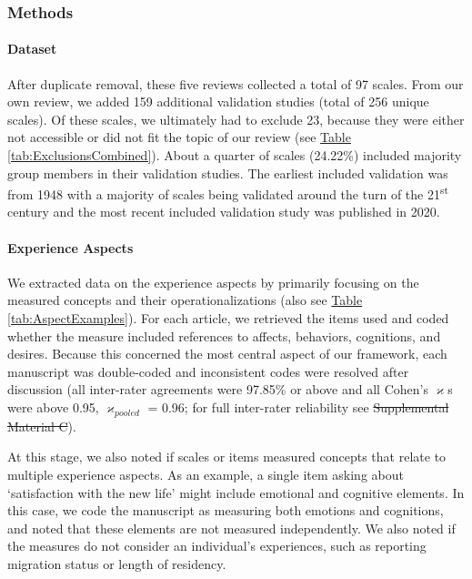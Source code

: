 \documentclass[man, 12pt, a4paper, mask]{apa7}
\newcommand{\tblref}[2][]{\hyperref[#2]{Table \ref*{#2}#1}}
\newcommand{\siannotatedanalyses}{Supplemental Material B} %
\providecommand{\DIFaddtex}[1]{{\protect\color{blue}\uwave{#1}}} %
\providecommand{\DIFdeltex}[1]{{\protect\color{red}\sout{#1}}}                      %
\providecommand{\DIFaddbegin}{} %
\providecommand{\DIFaddend}{} %
\providecommand{\DIFdelbegin}{} %
\providecommand{\DIFdelend}{} %
\providecommand{\DIFadd}[1]{\texorpdfstring{\DIFaddtex{#1}}{#1}} %
\providecommand{\DIFdel}[1]{\texorpdfstring{\DIFdeltex{#1}}{}} %
\newcommand{\DIFscaledelfig}{0.5}
\newlength{\DIFdelgraphicswidth} %
\newlength{\DIFdelgraphicsheight} %
\newcommand{\DIFaddincludegraphics}[2][]{{\color{blue}\fbox{\DIFOincludegraphics[#1]{#2}}}} %
\newcommand{\DIFdelincludegraphics}[2][]{%
\sbox{\DIFdelgraphicsbox}{\DIFOincludegraphics[#1]{#2}}%
\settoboxwidth{\DIFdelgraphicswidth}{\DIFdelgraphicsbox} %
\settoboxtotalheight{\DIFdelgraphicsheight}{\DIFdelgraphicsbox} %
\scalebox{\DIFscaledelfig}{%
\parbox[b]{\DIFdelgraphicswidth}{\usebox{\DIFdelgraphicsbox}\\[-\baselineskip] \rule{\DIFdelgraphicswidth}{0em}}\llap{\resizebox{\DIFdelgraphicswidth}{\DIFdelgraphicsheight}{%
\setlength{\unitlength}{\DIFdelgraphicswidth}%
\begin{picture}(1,1)%
\thicklines\linethickness{2pt} %
{\color[rgb]{1,0,0}\put(0,0){\framebox(1,1){}}}%
{\color[rgb]{1,0,0}\put(0,0){\line( 1,1){1}}}%
{\color[rgb]{1,0,0}\put(0,1){\line(1,-1){1}}}%
\end{picture}%
}\hspace*{3pt}}} %
} %
\DeclareRobustCommand{\DIFaddbegin}{\DIFOaddbegin \let\includegraphics\DIFaddincludegraphics} %
\DeclareRobustCommand{\DIFaddend}{\DIFOaddend \let\includegraphics\DIFOincludegraphics} %
\DeclareRobustCommand{\DIFdelbegin}{\DIFOdelbegin \let\includegraphics\DIFdelincludegraphics} %
\DeclareRobustCommand{\DIFdelend}{\DIFOaddend \let\includegraphics\DIFOincludegraphics} %
\begin{document}
\subsubsection{Methods}  
\paragraph{Dataset}

After duplicate removal, these five reviews collected a total of 97
scales. From our own review, we added 159 additional validation studies
(total of 256 unique scales). Of these scales, we ultimately had to
exclude 23, because they were either not accessible or did not fit the
topic of our review (see \tblref{tab:ExclusionsCombined}). About a
quarter of scales (24.22\%) included majority group members in their
validation studies. The earliest included validation was from 1948 with
a majority of scales being validated around the turn of the
21\textsuperscript{st} century and the most recent included validation
study was published in 2020.

\paragraph{Experience Aspects}

We extracted data on the experience aspects by primarily focusing on the
measured concepts and their operationalizations (also see
\tblref{tab:AspectExamples}). For each article, we retrieved the items
used and coded whether the measure included references to affects,
behaviors, cognitions, and desires. Because this concerned the most
central aspect of our framework, each manuscript was double-coded and
inconsistent codes were resolved after discussion (all inter-rater
agreements were 97.85\% or above and all Cohen's \(\varkappa\)s were
above 0.95, \(\varkappa_{pooled}\) = 0.96; for full inter-rater
reliability see \DIFdelbegin \DIFdel{Supplemental Material C}\DIFdelend \DIFaddbegin \DIFadd{\siannotatedanalyses}\DIFaddend ).

At this stage, we also noted if scales or items measured concepts that
relate to multiple experience aspects. As an example, a single item
asking about `satisfaction with the new life' might include emotional
and cognitive elements. In this case, we code the manuscript as
measuring both emotions and cognitions, and noted that these elements
are not measured independently. We also noted if the measures do not
consider an individual's experiences, such as reporting migration status
or length of residency.
\end{document}
